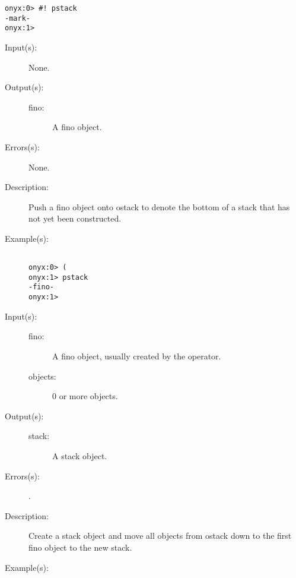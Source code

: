 \begin{description}
\begin{description}
\begin{verbatim}
onyx:0> #! pstack
-mark-
onyx:1>
		\end{verbatim}
	\end{description}
\label{systemdict:sym_lp}
\item[{\onyxop{--}{(}{fino}}: ]
	\begin{description}\item[]
	\item[Input(s): ] None.
	\item[Output(s): ]
		\begin{description}\item[]
		\item[fino: ]
			A fino object.
		\end{description}
	\item[Errors(s): ] None.
	\item[Description: ]
		Push a fino object onto ostack to denote the bottom of a stack
		that has not yet been constructed.
	\item[Example(s): ]\begin{verbatim}

onyx:0> (
onyx:1> pstack
-fino-
onyx:1>
		\end{verbatim}
	\end{description}
\label{systemdict:sym_rp}
\item[{\onyxop{fino objects}{)}{stack}}: ]
	\begin{description}\item[]
	\item[Input(s): ]
		\begin{description}\item[]
		\item[fino: ]
			A fino object, usually created by the \onyxop{}{)}{}
			operator.
		\item[objects: ]
			0 or more objects.
		\end{description}
	\item[Output(s): ]
		\begin{description}\item[]
		\item[stack: ]
			A stack object.
		\end{description}
	\item[Errors(s): ]
		\begin{description}\item[]
		\item[.]
		\end{description}
	\item[Description: ]
		Create a stack object and move all objects from ostack down to
		the first fino object to the new stack.
	\item[Example(s): ]\begin{verbatim}


\end{verbatim}
\end{description}
\end{description}
